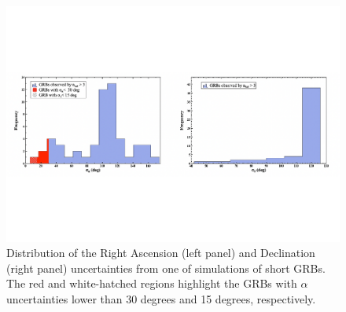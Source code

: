 \documentclass[]{spie}  %
\begin{document}
\vspace{-3cm}
\begin{figure}[h!]
\centering
\includegraphics[scale=0.6,angle=0]{res_short_pos}
\vspace{-4cm}
\caption{Distribution of the Right Ascension (left panel) and Declination (right panel) uncertainties from one of simulations of short GRBs. The red and white-hatched regions highlight the GRBs with $\alpha$ uncertainties lower than 30 degrees and 15 degrees, respectively.} 
\label{fig:res_short}
\end{figure}
\end{document}
